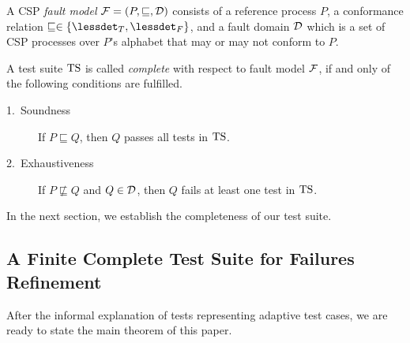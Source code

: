 A CSP \emph{fault model} ${\cal F} = (P,\sqsubseteq,{\cal D})$ consists of a
reference process $P$, a conformance relation $\sqsubseteq \in \{\lessdet_T,
\lessdet_F\}$, and a fault domain ${\cal D}$ which is a set of CSP processes
over $P$'s alphabet that may or may not conform to $P$.

A test suite ${\text{TS}}$ is called \emph{complete} with respect to fault model ${\cal F}$,
if and only of the following conditions are fulfilled.
\begin{description}
\item[1.~Soundness] If $P \sqsubseteq Q$, then $Q$ passes all tests in ${\text{TS}}$.
\item[2.~Exhaustiveness] If $P \not\sqsubseteq Q$ and $Q\in{\cal D}$,
then $Q$ fails at least one test in ${\text{TS}}$.
\end{description}
%
In the next section, we establish the completeness of our test suite.

\subsection{A Finite Complete Test Suite for Failures Refinement}

After the informal explanation of tests representing adaptive test cases, we are ready to state the main theorem of this paper.

